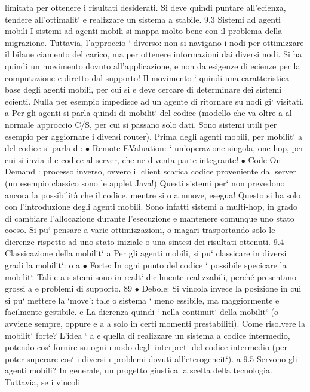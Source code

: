 \documentclass[a4paper,12pt]{article}
\begin{document}
limitata per ottenere i risultati desiderati. Si
deve quindi puntare all'ecienza, tendere all'ottimalit` e realizzare un sistema
a
stabile.
9.3
Sistemi ad agenti mobili
I sistemi ad agenti mobili si mappa molto bene con il problema della migrazione.
Tuttavia, l'approccio ` diverso: non si navigano i nodi per ottimizzare il bilane
ciamento del carico, ma per ottenere informazioni dai diversi nodi. Si ha quindi
un movimento dovuto all'applicazione, e non da esigenze di ecienze per la
computazione e diretto dal supporto!
Il movimento ` quindi una caratteristica base degli agenti mobili, per cui si
e
deve cercare di determinare dei sistemi ecienti. Nulla per esempio impedisce
ad un agente di ritornare su nodi gi` visitati.
a
Per gli agenti si parla quindi di mobilit` del codice (modello che va oltre
a
al normale approccio C/S, per cui si passano solo dati. Sono sistemi utili per
esempio per aggiornare i diversi router). Prima degli agenti mobili, per mobilit`
a
del codice si parla di:
$\bullet$ Remote EValuation: ` un'operazione singola, one-hop, per cui si invia il
e
codice al server, che ne diventa parte integrante!
$\bullet$ Code On Demand : processo inverso, ovvero il client scarica codice proveniente dal server (un esempio classico
sono le applet Java!)
Questi sistemi per` non prevedono ancora la possibilità che il codice, mentre si
o
a
muove, esegua! Questo si ha solo con l'introduzione degli agenti mobili. Sono infatti sistemi a multi-hop, in grado di
cambiare l'allocazione durante l'esecuzione
e mantenere comunque uno stato coeso. Si pu` pensare a varie ottimizzazioni,
o
magari trasportando solo le dierenze rispetto ad uno stato iniziale o una sintesi
dei risultati ottenuti.
9.4
Classicazione della mobilit`
a
Per gli agenti mobili, si pu` classicare in diversi gradi la mobilit`:
o
a
$\bullet$ Forte: In ogni punto del codice ` possibile specicare la mobilit`. Tali
e
a
sistemi sono in realt` dicilmente realizzabili, perché presentano grossi
a
e
problemi di supporto.
89
\newpage
$\bullet$ Debole: Si vincola invece la posizione in cui si pu` mettere la {`}move': tale
o
sistema ` meno essibile, ma maggiormente e facilmente gestibile.
e
La dierenza quindi ` nella continuit` della mobilit` (o avviene sempre, oppure
e
a
a
solo in certi momenti prestabiliti). Come risolvere la mobilit` forte? L'idea `
a
e
quella di realizzare un sistema a codice intermedio, potendo cos` fornire su ogni
\i{}
nodo degli interpreti del codice intermedio (per poter superare cos` i diversi
\i{}
problemi dovuti all'eterogeneit`).
a
9.5
Servono gli agenti mobili?
In generale, un progetto giustica la scelta della tecnologia. Tuttavia, se i vincoli
\end{document}
